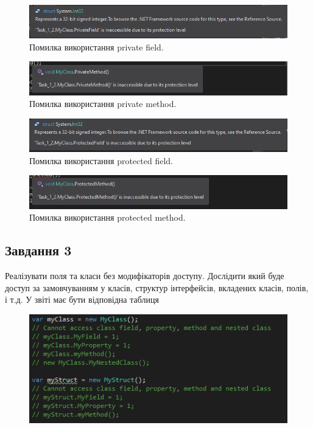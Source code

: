 \documentclass[oneside,14pt]{extarticle}
\begin{document}
\begin{normalsize}
	\begin{figure}[H]
		\centering
		\includegraphics[scale=0.7]{1_2_1}
		\caption{Помилка використання private field.}
	\end{figure}
	
	\begin{figure}[H]
		\centering
		\includegraphics[scale=0.7]{1_2_2}
		\caption{Помилка використання private method.}
	\end{figure}
	
	\begin{figure}[H]
		\centering
		\includegraphics[scale=0.7]{1_2_3}
		\caption{Помилка використання protected field.}
	\end{figure}
	
	\begin{figure}[H]
		\centering
		\includegraphics[scale=0.7]{1_2_4}
		\caption{Помилка використання protected method.}
	\end{figure}

	\subsection*{Завдання 3}
	Реалізувати поля та класи без модифікаторів доступу. Дослідити який буде доступ
	за замовчуванням у класів, структур інтерфейсів, вкладених класів, полів, і т.д. У
	звіті має бути відповідна таблиця
	\begin{figure}[H]
		\centering
		\includegraphics[scale=0.7]{13}
	\end{figure}
	

\end{normalsize}
\end{document}
